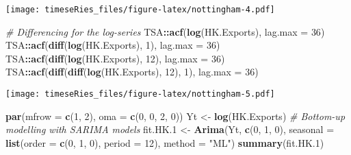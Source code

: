 \documentclass[]{book}
\newenvironment{Shaded}{\begin{snugshade}}{\end{snugshade}}
\newcommand{\KeywordTok}[1]{\textcolor[rgb]{0.13,0.29,0.53}{\textbf{#1}}}
\newcommand{\DataTypeTok}[1]{\textcolor[rgb]{0.13,0.29,0.53}{#1}}
\newcommand{\DecValTok}[1]{\textcolor[rgb]{0.00,0.00,0.81}{#1}}
\newcommand{\StringTok}[1]{\textcolor[rgb]{0.31,0.60,0.02}{#1}}
\newcommand{\CommentTok}[1]{\textcolor[rgb]{0.56,0.35,0.01}{\textit{#1}}}
\newcommand{\OperatorTok}[1]{\textcolor[rgb]{0.81,0.36,0.00}{\textbf{#1}}}
\newcommand{\NormalTok}[1]{#1}
\begin{document}
\texttt{[image: timeseRies\_files/figure-latex/nottingham-4.pdf]}

\begin{Shaded}
\begin{Highlighting}[]
\CommentTok{# Differencing for the log-series}
\NormalTok{TSA}\OperatorTok{::}\KeywordTok{acf}\NormalTok{(}\KeywordTok{log}\NormalTok{(HK.Exports), }\DataTypeTok{lag.max =} \DecValTok{36}\NormalTok{)}
\NormalTok{TSA}\OperatorTok{::}\KeywordTok{acf}\NormalTok{(}\KeywordTok{diff}\NormalTok{(}\KeywordTok{log}\NormalTok{(HK.Exports), }\DecValTok{1}\NormalTok{), }\DataTypeTok{lag.max =} \DecValTok{36}\NormalTok{)}
\NormalTok{TSA}\OperatorTok{::}\KeywordTok{acf}\NormalTok{(}\KeywordTok{diff}\NormalTok{(}\KeywordTok{log}\NormalTok{(HK.Exports), }\DecValTok{12}\NormalTok{), }\DataTypeTok{lag.max =} \DecValTok{36}\NormalTok{)}
\NormalTok{TSA}\OperatorTok{::}\KeywordTok{acf}\NormalTok{(}\KeywordTok{diff}\NormalTok{(}\KeywordTok{diff}\NormalTok{(}\KeywordTok{log}\NormalTok{(HK.Exports), }\DecValTok{12}\NormalTok{), }\DecValTok{1}\NormalTok{), }\DataTypeTok{lag.max =} \DecValTok{36}\NormalTok{)}
\end{Highlighting}
\end{Shaded}

\texttt{[image: timeseRies\_files/figure-latex/nottingham-5.pdf]}

\begin{Shaded}
\begin{Highlighting}[]
\KeywordTok{par}\NormalTok{(}\DataTypeTok{mfrow =} \KeywordTok{c}\NormalTok{(}\DecValTok{1}\NormalTok{, }\DecValTok{2}\NormalTok{), }\DataTypeTok{oma =} \KeywordTok{c}\NormalTok{(}\DecValTok{0}\NormalTok{, }\DecValTok{0}\NormalTok{, }\DecValTok{2}\NormalTok{, }\DecValTok{0}\NormalTok{))}
\NormalTok{Yt <-}\StringTok{ }\KeywordTok{log}\NormalTok{(HK.Exports)}
\CommentTok{# Bottom-up modelling with SARIMA models}
\NormalTok{fit.HK.}\DecValTok{1}\NormalTok{ <-}\StringTok{ }\KeywordTok{Arima}\NormalTok{(Yt, }\KeywordTok{c}\NormalTok{(}\DecValTok{0}\NormalTok{, }\DecValTok{1}\NormalTok{, }\DecValTok{0}\NormalTok{), }\DataTypeTok{seasonal =} \KeywordTok{list}\NormalTok{(}\DataTypeTok{order =} \KeywordTok{c}\NormalTok{(}\DecValTok{0}\NormalTok{, }\DecValTok{1}\NormalTok{, }\DecValTok{0}\NormalTok{), }\DataTypeTok{period =} \DecValTok{12}\NormalTok{), }
    \DataTypeTok{method =} \StringTok{"ML"}\NormalTok{)}
\KeywordTok{summary}\NormalTok{(fit.HK.}\DecValTok{1}\NormalTok{)}
\end{Highlighting}
\end{Shaded}
\end{document}
